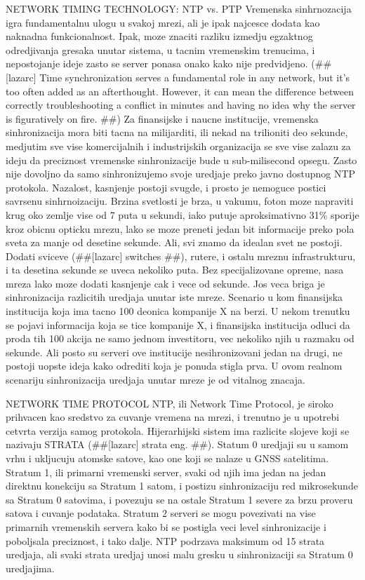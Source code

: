 \documentclass[a4paper,12pt, master]{etf}
\begin{document}
	NETWORK TIMING TECHNOLOGY: NTP vs. PTP
	Vremenska sinhrnozacija igra fundamentalnu ulogu u svakoj mrezi, ali je ipak najcesce 
	dodata kao naknadna funkcionalnost. Ipak, moze znaciti razliku izmedju egzaktnog 
	odredjivanja gresaka unutar sistema, u tacnim vremenskim trenucima, i nepostojanje ideje 
	zasto se server ponasa onako kako nije predvidjeno. (\#\#[lazarc] Time synchronization 
	serves a fundamental role in any network, but it's too often added as an afterthought. 
	However, it can mean the difference between correctly troubleshooting a conflict in 
	minutes and having no idea why the server is figuratively on fire. \#\#) Za finansijske i 
	naucne institucije, vremenska sinhronizacija mora biti tacna na milijarditi, ili nekad na 
	trilioniti deo sekunde, medjutim sve vise komercijalnih i industrijskih organizacija se 
	sve vise zalazu za ideju da preciznost vremenske sinhronizacije bude u sub-milisecond 
	opsegu.
	Zasto nije dovoljno da samo sinhronizujemo svoje uredjaje preko javno dostupnog NTP 
	protokola. Nazalost, kasnjenje postoji svugde, i prosto je nemoguce postici savrsenu 
	sinhrnoizaciju. Brzina svetlosti je brza, u vakumu, foton moze napraviti krug oko zemlje 
	vise od 7 puta u sekundi, iako putuje aproksimativno 31\% sporije kroz obicnu opticku 
	mrezu, lako se moze preneti jedan bit informacije preko pola sveta za manje od desetine 
	sekunde.
	Ali, svi znamo da idealan svet ne postoji. Dodati sviceve (\#\#[lazarc] switches \#\#), 
	rutere, i ostalu mreznu infrastrukturu, i ta desetina sekunde se uveca nekoliko puta. Bez 
	specijalizovane opreme, nasa mreza lako moze dodati kasnjenje cak i vece od sekunde.
	Jos veca briga je sinhronizacija razlicitih uredjaja unutar iste mreze. Scenario u kom 
	finansijska institucija koja ima tacno 100 deonica kompanije X na berzi. U nekom trenutku 
	se pojavi informacija koja se tice kompanije X, i finansijska institucija odluci da proda 
	tih 100 akcija ne samo jednom investitoru, vec nekoliko njih u razmaku od sekunde. Ali 
	posto su serveri ove institucije nesihronizovani jedan na drugi, ne postoji uopste ideja 
	kako odrediti koja je ponuda stigla prva. U ovom realnom scenariju sinhronizacija 
	uredjaja unutar mreze je od vitalnog znacaja.

	NETWORK TIME PROTOCOL
	NTP, ili Network Time Protocol, je siroko prihvacen kao sredstvo za cuvanje vremena na 
	mrezi, i trenutno je u upotrebi cetvrta verzija samog protokola. Hijerarhijski sistem ima 
	razlicite slojeve koji se nazivaju STRATA (\#\#[lazarc] strata eng. \#\#). Statum 0 
	uredjaji su u samom vrhu i ukljucuju atomske satove, kao one koji se nalaze u GNSS 
	satelitima.	Stratum 1, ili primarni vremenski server, svaki od njih ima jedan na jedan 
	direktnu konekciju sa Stratum 1 satom, i postizu sinhronizaciju red mikrosekunde sa Stratum 
	0 satovima, i povezuju se na ostale Stratum 1 severe za brzu proveru satova i cuvanje 
	podataka. Stratum 2 serveri se mogu povezivati na vise primarnih vremenskih servera kako 
	bi se postigla veci level sinhronizacije i poboljsala preciznost, i tako dalje. NTP 
	podrzava maksimum od 15 strata uredjaja, ali svaki strata uredjaj unosi malu gresku u 
	sinhronizaciji sa Stratum 0 uredjajima.
\end{document}
